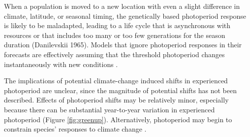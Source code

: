 \documentclass{article}
\begin{document}
When a population is moved to a new location with even a slight difference in climate, latitude, or seasonal timing, the genetically based photoperiod response is likely to be maladapted, leading to a life cycle that is asynchronous with resources or that includes too many or too few generations for the season duration (Danilevskii 1965). Models that ignore photoperiod responses in their forecasts are effectively assuming that the threshold photoperiod changes instantaneously with new conditions \citep{grevstad2015}. 
\par The implications of potential climate-change induced shifts in experienced photoperiod are unclear, since the magnitude of potential shifts has not been described. Effects of photoperiod shifts may be relatively minor, especially because there can be substantial year-to-year variation in experienced photoperiod (Figure \ref{fig:greenup}). Alternatively, photoperiod may begin to constrain species' responses to climate change \citep{koerner2010b}.
\end{document}
